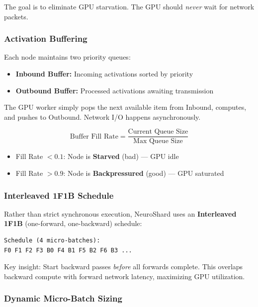 \documentclass[11pt,a4paper]{article}
\begin{document}
The goal is to eliminate GPU starvation. The GPU should \textit{never} wait for network packets.

\subsubsection{Activation Buffering}

Each node maintains two priority queues:

\begin{itemize}
    \item \textbf{Inbound Buffer:} Incoming activations sorted by priority
    \item \textbf{Outbound Buffer:} Processed activations awaiting transmission
\end{itemize}

The GPU worker simply pops the next available item from Inbound, computes, and pushes to Outbound. Network I/O happens asynchronously.

\begin{equation}
\text{Buffer Fill Rate} = \frac{\text{Current Queue Size}}{\text{Max Queue Size}}
\end{equation}

\begin{itemize}
    \item Fill Rate $< 0.1$: Node is \textbf{Starved} (bad) --- GPU idle
    \item Fill Rate $> 0.9$: Node is \textbf{Backpressured} (good) --- GPU saturated
\end{itemize}

\subsubsection{Interleaved 1F1B Schedule}

Rather than strict synchronous execution, NeuroShard uses an \textbf{Interleaved 1F1B} (one-forward, one-backward) schedule:

\begin{verbatim}
Schedule (4 micro-batches):
F0 F1 F2 F3 B0 F4 B1 F5 B2 F6 B3 ...
\end{verbatim}

Key insight: Start backward passes \textit{before} all forwards complete. This overlaps backward compute with forward network latency, maximizing GPU utilization.

\subsubsection{Dynamic Micro-Batch Sizing}
\end{document}
